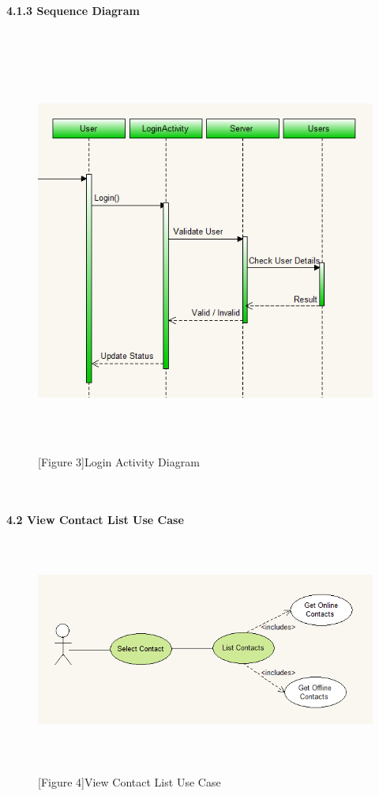 \documentclass[29pt,a4paper]{moderncv}
\begin{document}
\newpage	
			\left\textbf{4.1.3 Sequence Diagram}\\
			\\ \begin{figure}
				\centering
			\\	\includegraphics[width=5.5in, height=5.0in]{./loginActivity1.png}
				\\\caption{[Figure 3]Login Activity Diagram}
			\end{figure}	\\

\newpage
	\\ \left\textbf{4.2 View Contact List Use Case} \\
		\begin{figure}
			\centering
			\\ \includegraphics[width=6.0in, height=2.5in]{./viewContactsCase.png} \\
			\\\caption{[Figure 4]View Contact List Use Case}
		\end{figure}\\
		
\end{document}
